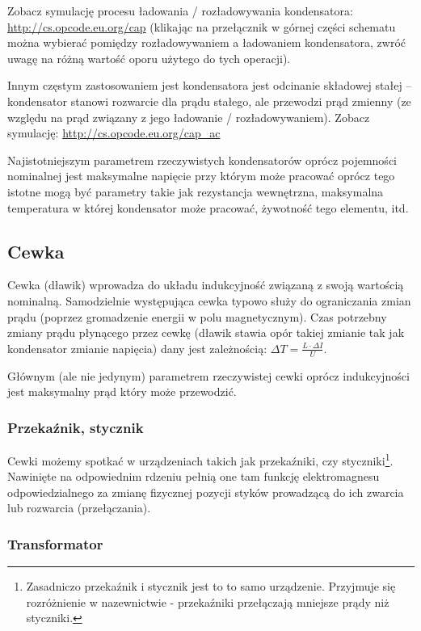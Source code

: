 Zobacz symulację procesu ładowania / rozładowywania kondensatora: \url{http://cs.opcode.eu.org/cap}
(klikając na przełącznik w górnej części schematu  można wybierać pomiędzy rozładowywaniem a ładowaniem kondensatora, zwróć uwagę na różną wartość oporu użytego do tych operacji).

Innym częstym zastosowaniem jest kondensatora jest odcinanie składowej stałej – kondensator stanowi rozwarcie dla prądu stałego, ale przewodzi prąd zmienny (ze względu na prąd związany z jego ładowanie / rozładowywaniem).
Zobacz symulację: \url{http://cs.opcode.eu.org/cap_ac}

Najistotniejszym parametrem rzeczywistych kondensatorów oprócz pojemności nominalnej jest maksymalne napięcie przy którym może pracować oprócz tego istotne mogą być parametry takie jak rezystancja wewnętrzna, maksymalna temperatura w której kondensator może pracować, żywotność tego elementu, itd.

\subsection{Cewka}

Cewka (dławik) wprowadza do układu indukcyjność związaną z swoją wartością nominalną. Samodzielnie występująca cewka typowo służy do ograniczania zmian prądu (poprzez gromadzenie energii w polu magnetycznym). Czas potrzebny zmiany prądu płynącego przez cewkę (dławik stawia opór takiej zmianie tak jak kondensator zmianie napięcia) dany jest zależnością: $\Delta T = \frac{L \cdot \Delta I}{U}$.

Głównym (ale nie jedynym) parametrem rzeczywistej cewki oprócz indukcyjności jest maksymalny prąd który może przewodzić.

\subsubsection{Przekaźnik, stycznik}

Cewki możemy spotkać w urządzeniach takich jak przekaźniki, czy styczniki\footnote{Zasadniczo przekaźnik i stycznik jest to to samo urządzenie. Przyjmuje się rozróżnienie w nazewnictwie - przekaźniki przełączają mniejsze prądy niż styczniki.}.
Nawinięte na odpowiednim rdzeniu pełnią one tam funkcję elektromagnesu odpowiedzialnego za zmianę fizycznej pozycji styków prowadzącą do ich zwarcia lub rozwarcia (przełączania).

\subsubsection{Transformator}

